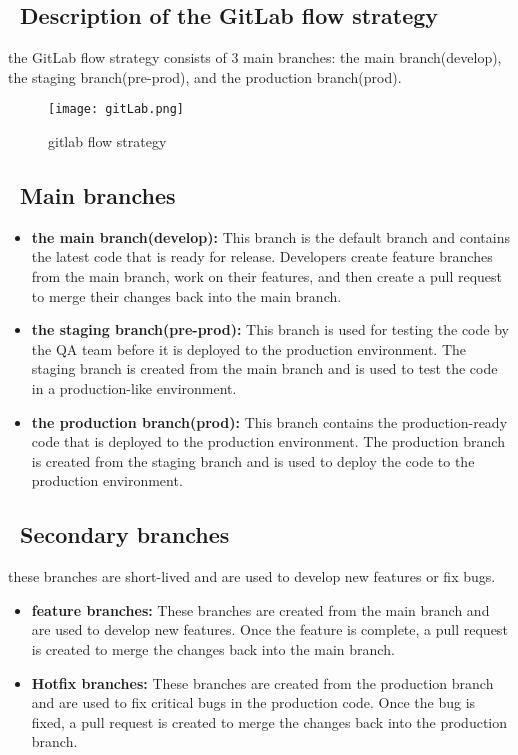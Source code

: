 \subsection*{ \textbullet\ Description of the GitLab flow strategy}
the GitLab flow strategy consists of 3 main branches: the main branch(develop), the staging branch(pre-prod), and the production branch(prod).

\begin{figure}[H]
    \centering
    \texttt{[image: gitLab.png]}
    \caption{gitlab flow strategy}
    \label{fig:gitlab}
\end{figure}

\subsection*{ \textbullet\ Main branches}
\begin{itemize}
    \item \textbf{the main branch(develop):} This branch is the default branch and contains the latest code that is ready for release. Developers create feature branches from the main branch, work on their features, and then create a pull request to merge their changes back into the main branch.
    \item \textbf{the staging branch(pre-prod):} This branch is used for testing the code by the QA team before it is deployed to the production environment. The staging branch is created from the main branch and is used to test the code in a production-like environment.
    \item \textbf{the production branch(prod):} This branch contains the production-ready code that is deployed to the production environment. The production branch is created from the staging branch and is used to deploy the code to the production environment.
\end{itemize}
\subsection*{ \textbullet\ Secondary branches}
these branches are short-lived and are used to develop new features or fix bugs.
\begin{itemize}
    \item \textbf{feature branches:} These branches are created from the main branch and are used to develop new features. Once the feature is complete, a pull request is created to merge the changes back into the main branch.
    \item \textbf{Hotfix branches:} These branches are created from the production branch and are used to fix critical bugs in the production code. Once the bug is fixed, a pull request is created to merge the changes back into the production branch.
\end{itemize}

